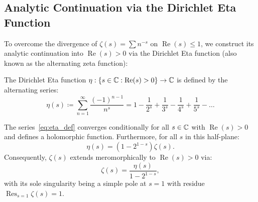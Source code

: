 \subsection{Analytic Continuation via the Dirichlet Eta Function}

To overcome the divergence of $\zeta(s) = \sum n^{-s}$ on $\operatorname{Re}(s) \le 1$, we construct its analytic continuation into $\operatorname{Re}(s) > 0$ via the Dirichlet Eta function (also known as the alternating zeta function):

\begin{definition}
\label{def:dirichlet_eta}
\leanok
The Dirichlet Eta function $\eta : \{s \in \mathbb{C} : \operatorname{Re}(s) > 0\} \to \mathbb{C}$ is defined by the alternating series:
\begin{equation}
\label{eq:eta_def}
\eta(s) \coloneqq \sum_{n=1}^\infty \frac{(-1)^{n-1}}{n^s} = 1 - \frac{1}{2^s} + \frac{1}{3^s} - \frac{1}{4^s} + \frac{1}{5^s} - \dots
\end{equation}
\end{definition}

\begin{theorem}
\label{thm:eta_continuation}
\leanok
The series~\eqref{eq:eta_def} converges conditionally for all $s \in \mathbb{C}$ with $\operatorname{Re}(s) > 0$ and defines a holomorphic function. Furthermore, for all $s$ in this half-plane:
\begin{equation}
\label{eq:eta_zeta_identity}
\eta(s) = \left(1 - 2^{1-s}\right) \zeta(s).
\end{equation}
Consequently, $\zeta(s)$ extends meromorphically to $\operatorname{Re}(s) > 0$ via:
\begin{equation}
\label{eq:zeta_via_eta}
\zeta(s) = \frac{\eta(s)}{1 - 2^{1-s}},
\end{equation}
with its sole singularity being a simple pole at $s = 1$ with residue $\operatorname{Res}_{s=1} \zeta(s) = 1$.
\end{theorem}

